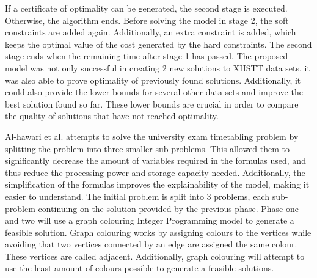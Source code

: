 If a certificate of optimality can be generated, the second stage is executed. Otherwise, the algorithm ends. Before solving the model in stage 2, the soft constraints are added again. Additionally, an extra constraint is added, which keeps the optimal value of the cost generated by the hard constraints. The second stage ends when the remaining time after stage 1 has passed. The proposed model was not only successful in creating 2 new solutions to XHSTT data sets, it was also able to prove optimality of previously found solutions. Additionally, it could also provide the lower bounds for several other data sets and improve the best solution found so far. These lower bounds are crucial in order to compare the quality of solutions that have not reached optimality.

Al-hawari et al. \cite{hawari2017} attempts to solve the university exam timetabling problem by splitting the problem into three smaller sub-problems. This allowed them to significantly decrease the amount of variables required in the formulas used, and thus reduce the processing power and storage capacity needed. Additionally, the simplification of the formulas improves the explainability of the model, making it easier to understand. The initial problem is split into 3 problems, each sub-problem continuing on the solution provided by the previous phase. Phase one and two will use a  graph colouring Integer Programming model to generate a feasible solution. Graph colouring works by assigning colours to the vertices while avoiding that two vertices connected by an edge are assigned the same colour. These vertices are called adjacent. Additionally, graph colouring will attempt to use the least amount of colours possible to generate a feasible solutions.

